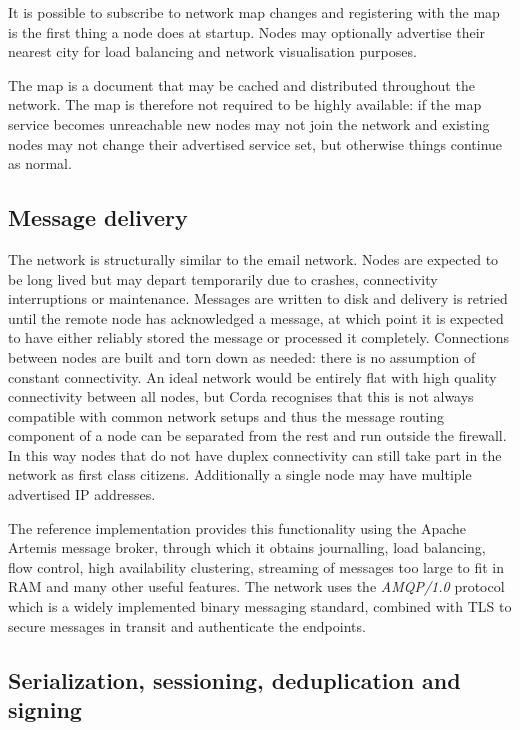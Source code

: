 \documentclass{article}
\begin{document}
It is possible to subscribe to network map changes and registering with the map is the first thing a node does at
startup. Nodes may optionally advertise their nearest city for load balancing and network visualisation purposes.

The map is a document that may be cached and distributed throughout the network. The map is therefore not required
to be highly available: if the map service becomes unreachable new nodes may not join the network and existing nodes
may not change their advertised service set, but otherwise things continue as normal.

\subsection{Message delivery}

The network is structurally similar to the email network. Nodes are expected to be long lived but may depart
temporarily due to crashes, connectivity interruptions or maintenance. Messages are written to disk
and delivery is retried until the remote node has acknowledged a message, at which point it is expected to have
either reliably stored the message or processed it completely. Connections between nodes are built and torn down as
needed: there is no assumption of constant connectivity. An ideal network would be entirely flat with high quality
connectivity between all nodes, but Corda recognises that this is not always compatible with common network
setups and thus the message routing component of a node can be separated from the rest and run outside the firewall.
In this way nodes that do not have duplex connectivity can still take part in the network as first class citizens.
Additionally a single node may have multiple advertised IP addresses.

The reference implementation provides this functionality using the Apache Artemis message broker, through which it
obtains journalling, load balancing, flow control, high availability clustering, streaming of messages too large to fit
in RAM and many other useful features. The network uses the \emph{AMQP/1.0}\cite{AMQP} protocol which is a widely
implemented binary messaging standard, combined with TLS to secure messages in transit and authenticate the endpoints.

\subsection{Serialization, sessioning, deduplication and signing}
\end{document}
